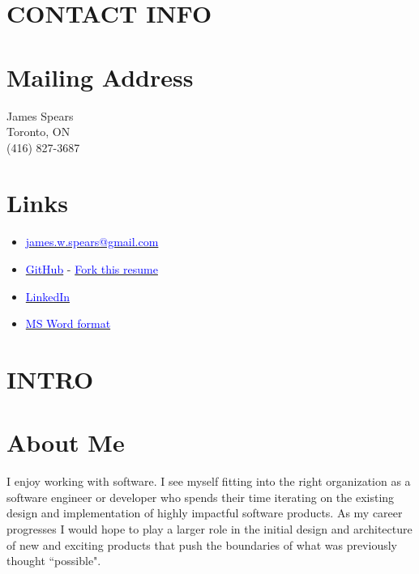 \documentclass[margin]{res}
\begin{document}
\name{\textcolor{NavyBlue}{James Spears} - \textcolor{black}{\bf Software Developer} }

\begin{resume}

	\section{\textcolor{NavyBlue}{CONTACT INFO}}

	\normalsize{\section{Mailing Address}}
	{James Spears \\ Toronto, ON \\ (416) 827-3687}

	\normalsize{\section{Links}}
	\begin{itemize}
		\item \href{mailto:james.w.spears@gmail.com}{\textcolor{blue}{james.w.spears@gmail.com}}
		\item \href{https://github.com/jameswspears}{\textcolor{blue}{GitHub}} - \href{https://github.com/jameswspears/resume}{\textcolor{blue}{Fork this resume}}
		\item \href{https://www.linkedin.com/in/james-spears-50834b8a/}{\textcolor{blue}{LinkedIn}}
		\item \href{https://s3.amazonaws.com/james-spears.com/resume.docx}{\textcolor{blue}{MS Word format}}
	\end{itemize}

	\section{\textcolor{NavyBlue}{INTRO}}

	\normalsize{\section{About Me}}
	I enjoy working with software. I see myself fitting into the right organization
	as a software engineer or developer who spends their time iterating on the existing design
	and implementation of highly impactful software products. As my career progresses I would
	hope to play a larger role in the initial design and architecture of new and exciting products that
	push the boundaries of what was previously thought ``possible".


\end{resume}
\end{document}
